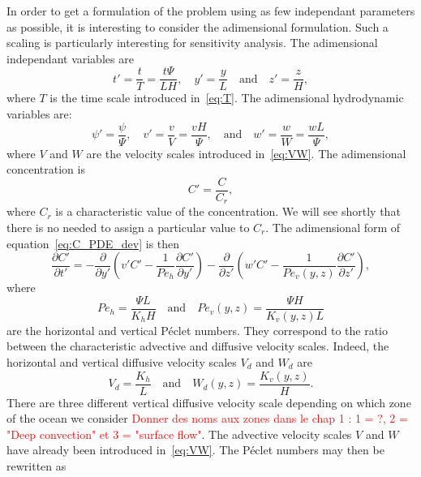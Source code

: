 In order to get a formulation of the problem using as few independant parameters as possible, it is interesting to consider the adimensional formulation. Such a scaling is particularly interesting for sensitivity analysis. The adimensional independant variables are
\begin{equation}
	t' = \frac{t}{T} = \frac{t\Psi}{LH}, \quad y' = \frac{y}{L} \quad \mbox{and} \quad z' = \frac{z}{H},   	
\end{equation}
where $T$ is the time scale introduced in~\eqref{eq:T}. The adimensional hydrodynamic variables are:
\begin{equation}
	\psi' = \frac{\psi}{\Psi}, \quad v' = \frac{v}{V} = \frac{vH}{\Psi}, \quad \mbox{and} \quad w' = \frac{w}{W} = \frac{wL}{\Psi},
\end{equation}
where $V$ and $W$ are the velocity scales introduced in~\eqref{eq:VW}. The adimensional concentration is
\begin{equation}
	C' = \frac{C}{C_r}, 	
\end{equation}
where $C_r$ is a characteristic value of the concentration. We will see shortly that there is no needed to assign a particular value to $C_r$. The adimensional form of equation~\eqref{eq:C_PDE_dev} is then
\begin{equation}\label{eq:PDE_adim}
	\frac{\partial C'}{\partial t'} = -\frac{\partial}{\partial y'}\left(v'C' - \frac{1}{Pe_h}\frac{\partial C'}{\partial y'}\right) -\frac{\partial}{\partial z'}\left(w'C' - \frac{1}{Pe_v(y,z)}\frac{\partial C'}{\partial z'}\right),
\end{equation}
where
\begin{equation}
	Pe_h = \frac{\Psi L}{K_h H} \quad \mbox{and} \quad Pe_v(y,z) = \frac{\Psi H}{K_v(y,z)L}
\end{equation}
are the horizontal and vertical Péclet numbers. They correspond to the ratio between the characteristic advective and diffusive velocity scales. Indeed, the horizontal and vertical diffusive velocity scales $V_{d}$ and $W_{d}$ are 
\begin{equation}
	V_{d} = \frac{K_h}{L} \quad \mbox{and} \quad W_{d}(y,z) = \frac{K_v(y,z)}{H}.
\end{equation}
There are three different vertical diffusive velocity scale depending on which zone of the ocean we consider \textcolor{red}{Donner des noms aux zones dans le chap 1 : 1 = ?, 2 = "Deep convection" et 3 = "surface flow"}. The advective velocity scales $V$ and $W$ have already been introduced in~\eqref{eq:VW}. The Péclet numbers may then be rewritten as

